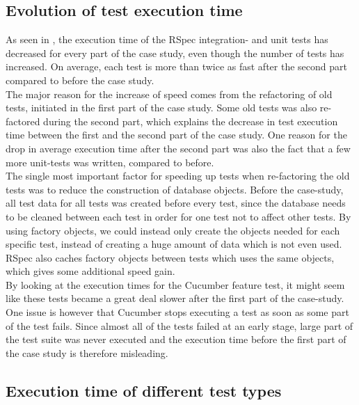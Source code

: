 
\subsection{Evolution of test execution time}

As seen in , the execution time of the RSpec
integration- and unit tests has decreased for every part of the case
study, even though the number of tests has increased. On average, each
test is more than twice as fast after the second part compared to before
the case study.\\

The major reason for the increase of speed comes from the refactoring of
old tests, initiated in the first part of the case study. Some old tests
was also re-factored during the second part, which explains the decrease
in test execution time between the first and the second part of the case
study. One reason for the drop in average execution time after the
second part was also the fact that a few more unit-tests was written,
compared to before.\\

The single most important factor for speeding up tests when re-factoring
the old tests was to reduce the construction of database objects. Before
the case-study, all test data for all tests was created before every
test, since the database needs to be cleaned between each test in order
for one test not to affect other tests. By using factory objects, we
could instead only create the objects needed for each specific test,
instead of creating a huge amount of data which is not even used. RSpec
also caches factory objects between tests which uses the same objects,
which gives some additional speed gain.\\

By looking at the execution times for the Cucumber feature test, it
might seem like these tests became a great deal slower after the first
part of the case-study. One issue is however that Cucumber stops
executing a test as soon as some part of the test fails. Since almost
all of the tests failed at an early stage, large part of the test suite
was never executed and the execution time before the first part of the
case study is therefore misleading.\\


\subsection{Execution time of different test types}


